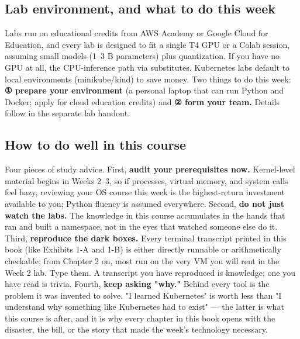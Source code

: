 \subsection*{Lab environment, and what to do this week}

Labs run on educational credits from AWS Academy or Google Cloud for Education, and every lab is designed to fit a single T4 GPU or a Colab session, assuming small models (1–3 B parameters) plus quantization. If you have no GPU at all, the CPU-inference path via  substitutes. Kubernetes labs default to local environments (minikube/kind) to save money. Two things to do this week: \textbf{① prepare your environment} (a personal laptop that can run Python and Docker; apply for cloud education credits) and \textbf{② form your team.} Details follow in the separate lab handout.

\subsection*{How to do well in this course}

Four pieces of study advice. First, \textbf{audit your prerequisites now.} Kernel-level material begins in Weeks 2–3, so if processes, virtual memory, and system calls feel hazy, reviewing your OS course this week is the highest-return investment available to you; Python fluency is assumed everywhere. Second, \textbf{do not just watch the labs.} The knowledge in this course accumulates in the hands that ran  and built a namespace, not in the eyes that watched someone else do it. Third, \textbf{reproduce the dark boxes.} Every terminal transcript printed in this book (like Exhibits 1-A and 1-B) is either directly runnable or arithmetically checkable; from Chapter 2 on, most run on the very VM you will rent in the Week 2 lab. Type them. A transcript you have reproduced is knowledge; one you have read is trivia. Fourth, \textbf{keep asking "why."} Behind every tool is the problem it was invented to solve. "I learned Kubernetes" is worth less than "I understand why something like Kubernetes had to exist" — the latter is what this course is after, and it is why every chapter in this book opens with the disaster, the bill, or the story that made the week's technology necessary.



